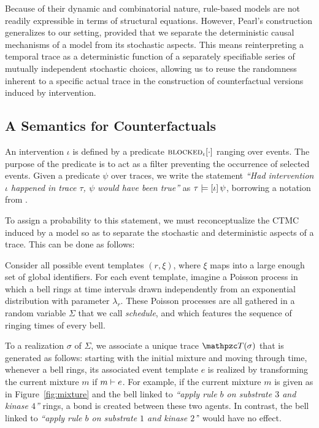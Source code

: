 Because of their dynamic and combinatorial nature, rule-based models
are not readily expressible in terms of structural equations.
However, Pearl's construction generalizes to our setting, provided
that we separate the deterministic causal mechanisms of a model from
its stochastic aspects. This means reinterpreting a temporal trace as
a deterministic function of a separately specifiable series of
mutually independent stochastic choices, allowing us to reuse the
randomness inherent to a specific actual trace in the construction of
counterfactual versions induced by intervention.

\iffalse Because of their dynamic and combinatorial nature, rule-based
models do not have structural equations that are readily available at
the outset. However, Pearl's construction generalizes to our setting,
provided that we separate the randomness of simulation from its
deterministic causal mechanisms. \fi

\subsection{A Semantics for Counterfactuals}
\label{subsec:counterfactuals-semantics}

An intervention $\iota$ is defined by a predicate
${\textsc{blocked}}_{\iota}[\cdot]$ ranging over events. The purpose of the
predicate is to act as a filter preventing the occurrence of selected
events. Given a predicate $\psi$ over traces, we write the statement
\textit{``Had intervention $\iota$ happened in trace $\tau$, $\psi$
  would have been true''} as $\tau \models [\iota] \, \psi{}$, borrowing a notation from
\cite{halpern2016actual}.

To assign a probability to this statement, we must reconceptualize the
CTMC induced by a model so as to separate the stochastic and
deterministic aspects of a trace.  This can be done as follows:
\begin{inparaenum}[(i)]
\item Consider all possible event templates $(r, \xi)$, where $\xi$
  maps into a large enough set of global identifiers. For each event
  template, imagine a Poisson process in which a bell rings at time
  intervals drawn independently from an exponential distribution with
  parameter $\lambda_r$. These Poisson processes are all gathered in a
  random variable $\Sigma$ that we call \emph{schedule}, and which
  features the sequence of ringing times of every bell.
\item To a realization $\sigma$ of $\Sigma$, we associate a unique
  trace $\DetTrace(\sigma)$ that is generated as follows: starting with the
  initial mixture and moving through time, whenever a bell rings, its
  associated event template $e$ is realized by transforming the
  current mixture $m$ if $m \vdash e$. For example, if the
  current mixture $m$ is given as in Figure~\ref{fig:mixture} and the
  bell linked to \textit{``apply rule $b$ on substrate $3$ and kinase
    $4$''} rings, a bond is created between these two agents. In
  contrast, the bell linked to \textit{``apply rule $b$ on substrate
    $1$ and kinase $2$'}' would have no effect.
\end{inparaenum}

